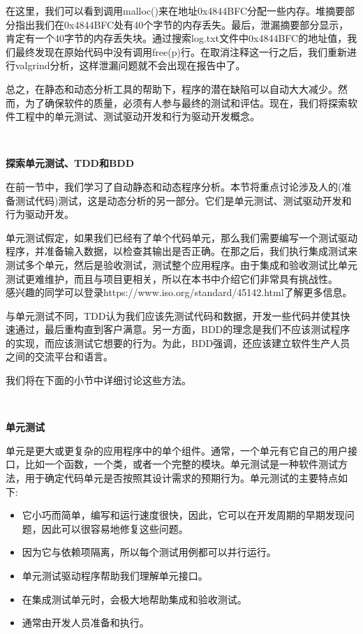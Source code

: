 在这里，我们可以看到调用malloc()来在地址0x4844BFC分配一些内存。堆摘要部分指出我们在0x4844BFC处有40个字节的内存丢失。最后，泄漏摘要部分显示，肯定有一个40字节的内存丢失块。通过搜索log.txt文件中0x4844BFC的地址值，我们最终发现在原始代码中没有调用free(p)行。在取消注释这一行之后，我们重新进行valgrind分析，这样泄漏问题就不会出现在报告中了。 \par
总之，在静态和动态分析工具的帮助下，程序的潜在缺陷可以自动大大减少。然而，为了确保软件的质量，必须有人参与最终的测试和评估。现在，我们将探索软件工程中的单元测试、测试驱动开发和行为驱动开发概念。 \par

\noindent\textbf{}\ \par
\textbf{探索单元测试、TDD和BDD} \ \par
在前一节中，我们学习了自动静态和动态程序分析。本节将重点讨论涉及人的(准备测试代码)测试，这是动态分析的另一部分。它们是单元测试、测试驱动开发和行为驱动开发。 \par
单元测试假定，如果我们已经有了单个代码单元，那么我们需要编写一个测试驱动程序，并准备输入数据，以检查其输出是否正确。在那之后，我们执行集成测试来测试多个单元，然后是验收测试，测试整个应用程序。由于集成和验收测试比单元测试更难维护，而且与项目更相关，所以在本书中介绍它们非常具有挑战性。\\感兴趣的同学可以登录https://www.iso.org/standard/45142.html了解更多信息。 \par
与单元测试不同，TDD认为我们应该先测试代码和数据，开发一些代码并使其快速通过，最后重构直到客户满意。另一方面，BDD的理念是我们不应该测试程序的实现，而应该测试它想要的行为。为此，BDD强调，还应该建立软件生产人员之间的交流平台和语言。 \par
我们将在下面的小节中详细讨论这些方法。 \par

\noindent\textbf{}\ \par
\textbf{单元测试} \ \par
单元是更大或更复杂的应用程序中的单个组件。通常，一个单元有它自己的用户接口，比如一个函数，一个类，或者一个完整的模块。单元测试是一种软件测试方法，用于确定代码单元是否按照其设计需求的预期行为。单元测试的主要特点如下: \par

\begin{itemize}
	\item 它小巧而简单，编写和运行速度很快，因此，它可以在开发周期的早期发现问题，因此可以很容易地修复这些问题。
	\item 因为它与依赖项隔离，所以每个测试用例都可以并行运行。
	\item 单元测试驱动程序帮助我们理解单元接口。
	\item 在集成测试单元时，会极大地帮助集成和验收测试。
	\item 通常由开发人员准备和执行。
\end{itemize}


